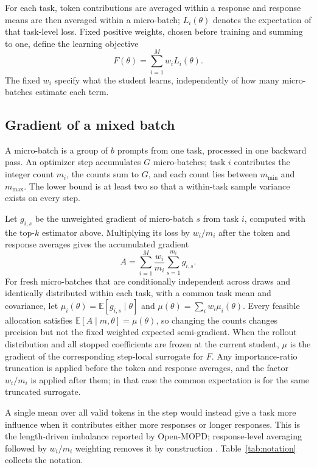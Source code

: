 For each task, token contributions are averaged within a response and response
means are then averaged within a micro-batch; $L_i(\theta)$ denotes the
expectation of that task-level loss. Fixed positive weights, chosen before
training and summing to one, define the learning objective
\begin{equation}
    F(\theta)=\sum_{i=1}^M w_i L_i(\theta).
    \label{eq:fixed_multitask_objective}
\end{equation}
The fixed $w_i$ specify what the student learns, independently of how many
micro-batches estimate each term.

\subsection{Gradient of a mixed batch}

A micro-batch is a group of $b$ prompts from one task, processed in one
backward pass. An optimizer step accumulates $G$ micro-batches; task $i$
contributes the integer count $m_i$, the counts sum to $G$, and each count lies
between $m_{\min}$ and $m_{\max}$. The lower bound is at least two so that a
within-task sample variance exists on every step.

Let $g_{i,s}$ be the unweighted gradient of micro-batch $s$ from task $i$,
computed with the top-$k$ estimator above. Multiplying its loss by $w_i/m_i$
after the token and response averages gives the accumulated gradient
\begin{equation}
    A=\sum_{i=1}^M\frac{w_i}{m_i}\sum_{s=1}^{m_i}g_{i,s}.
    \label{eq:batch_gradient_observation}
\end{equation}
For fresh micro-batches that are conditionally independent across draws and
identically distributed within each task, with a common task mean and
covariance, let
$\mu_i(\theta)=\mathbb E[g_{i,s}\mid\theta]$ and
$\mu(\theta)=\sum_iw_i\mu_i(\theta)$. Every feasible allocation satisfies
$\mathbb E[A\mid m,\theta]=\mu(\theta)$, so changing the counts changes
precision but not the fixed weighted expected semi-gradient. When the rollout
distribution and all stopped coefficients are frozen at the current student,
$\mu$ is the gradient of the corresponding step-local surrogate for $F$. Any importance-ratio truncation is applied before the token
and response averages, and the factor $w_i/m_i$ is applied after them; in that
case the common expectation is for the same truncated surrogate.

A single mean over all valid tokens in the step would instead give a task more
influence when it contributes either more responses or longer responses. This
is the length-driven imbalance reported by Open-MOPD; response-level averaging
followed by $w_i/m_i$ weighting removes it by construction
\citep{gao2026openmopddiagnosingfixingcapability}. Table~\ref{tab:notation}
collects the notation.
